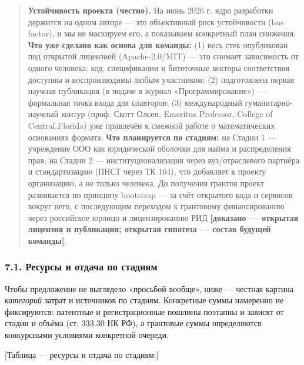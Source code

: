 \documentclass[
  russian,
]{article}
\begin{document}
\begin{quote}
\textbf{Устойчивость проекта (честно).} На июнь 2026 г. ядро разработки
держится на одном авторе --- это объективный риск устойчивости (bus
factor), и мы не маскируем его, а показываем конкретный план снижения.
\textbf{Что уже сделано как основа для команды:} (1) весь стек
опубликован под открытой лицензией (Apache-2.0/MIT) --- это снимает
зависимость от одного человека: код, спецификации и битоточные векторы
соответствия доступны и воспроизводимы любым участником; (2)
подготовлена первая научная публикация (в подаче в журнал
«Программирование») --- формальная точка входа для соавторов; (3)
международный гуманитарно-научный контур (проф. Скотт Олсен, Emeritus
Professor, College of Central Florida) уже привлечён к смежной работе о
математических основаниях формата. \textbf{Что планируется по стадиям:}
на Стадии 1 --- учреждение ООО как юридической оболочки для найма и
распределения прав; на Стадии 2 --- институционализация через
вуз/отраслевого партнёра и стандартизацию (ПНСТ через ТК 164), что
добавляет к проекту организацию, а не только человека. До получения
грантов проект развивается по принципу bootstrap --- за счёт открытого
кода и сервисов вокруг него, с последующим переходом к грантовому
финансированию через российское юрлицо и лицензированию РИД
\textbf{{[}доказано --- открытая лицензия и публикация; открытая
гипотеза --- состав будущей команды{]}}.
\end{quote}

\subsubsection{7.1. Ресурсы и отдача по
стадиям}\label{ux440ux435ux441ux443ux440ux441ux44b-ux438-ux43eux442ux434ux430ux447ux430-ux43fux43e-ux441ux442ux430ux434ux438ux44fux43c}

Чтобы предложение не выглядело «просьбой вообще», ниже --- честная
картина \emph{категорий} затрат и источников по стадиям. Конкретные
суммы намеренно не фиксируются: патентные и регистрационные пошлины
поэтапны и зависят от стадии и объёма (ст. 333.30 НК РФ), а грантовые
суммы определяются конкурсными условиями конкретной очереди.

{[}Таблица --- ресурсы и отдача по стадиям:{]}
\end{document}
